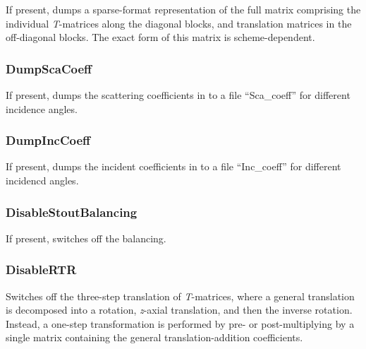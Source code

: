 \documentclass[
]{article}
\begin{document}
If present, dumps a sparse-format representation of the full matrix
comprising the individual \emph{T}-matrices along the diagonal blocks,
and translation matrices in the off-diagonal blocks. The exact form of
this matrix is scheme-dependent.

\hypertarget{dumpscacoeff}{%
\subsubsection{DumpScaCoeff}\label{dumpscacoeff}}

If present, dumps the scattering coefficients in to a file
``Sca\_coeff'' for different incidence angles.

\hypertarget{dumpinccoeff}{%
\subsubsection{DumpIncCoeff}\label{dumpinccoeff}}

If present, dumps the incident coefficients in to a file ``Inc\_coeff''
for different incidencd angles.

\hypertarget{disablestoutbalancing}{%
\subsubsection{DisableStoutBalancing}\label{disablestoutbalancing}}

If present, switches off the balancing.

\hypertarget{disablertr}{%
\subsubsection{DisableRTR}\label{disablertr}}

Switches off the three-step translation of \emph{T}-matrices, where a
general translation is decomposed into a rotation, \emph{z}-axial
translation, and then the inverse rotation. Instead, a one-step
transformation is performed by pre- or post-multiplying by a single
matrix containing the general translation-addition coefficients.
\end{document}
